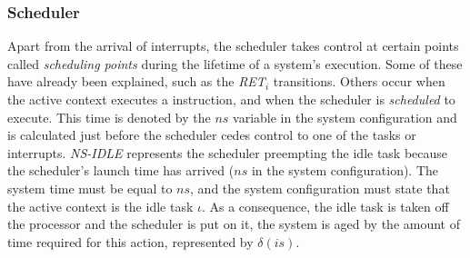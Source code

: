 

\subsubsection{Scheduler}
Apart from the arrival of interrupts, the scheduler takes control at
certain points called \emph{scheduling points} during the lifetime of
a system's execution. Some of these have already been explained, such
as the \emph{RET$_i$} transitions. Others occur when the active
context executes a  instruction, and when the
scheduler is \emph{scheduled} to execute. This time is denoted by the
$ns$ variable in the system configuration and is calculated just
before the scheduler cedes control to one of the tasks or
interrupts. \emph{NS-IDLE} represents the scheduler preempting the
idle task because the scheduler's launch time has arrived ($ns$ in the
system configuration). The system time must be equal to $ns$, and the
system configuration must state that the active context is the idle
task $\iota$. As a consequence, the idle task is taken off the
processor and the scheduler is put on it, the system is aged by the
amount of time required for this action, represented by $\delta(is)$.

